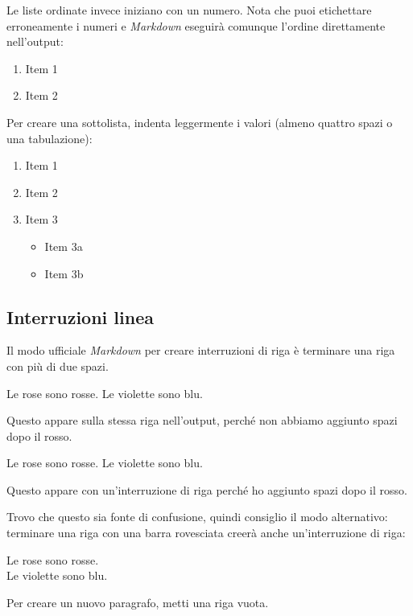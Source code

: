 \documentclass[a4paper, 11pt, nobind]{templates/ociamthesis}
\providecommand{\tightlist}{%
  \setlength{\itemsep}{0pt}\setlength{\parskip}{0pt}}
\begin{document}
Le liste ordinate invece iniziano con un numero.
Nota che puoi etichettare erroneamente i numeri e \emph{Markdown} eseguirà comunque l'ordine direttamente nell'output:

\begin{enumerate}
\def\labelenumi{\arabic{enumi}.}
\tightlist
\item
  Item 1
\item
  Item 2
\end{enumerate}

Per creare una sottolista, indenta leggermente i valori (almeno quattro spazi o una tabulazione):

\begin{enumerate}
\def\labelenumi{\arabic{enumi}.}
\tightlist
\item
  Item 1
\item
  Item 2
\item
  Item 3

  \begin{itemize}
  \tightlist
  \item
    Item 3a
  \item
    Item 3b
  \end{itemize}
\end{enumerate}

\hypertarget{interruzioni-linea}{%
\subsection{Interruzioni linea}\label{interruzioni-linea}}

Il modo ufficiale \emph{Markdown} per creare interruzioni di riga è terminare una riga con più di due spazi.

Le rose sono rosse.
Le violette sono blu.

Questo appare sulla stessa riga nell'output, perché non abbiamo aggiunto spazi dopo il rosso.

Le rose sono rosse.
Le violette sono blu.

Questo appare con un'interruzione di riga perché ho aggiunto spazi dopo il rosso.

Trovo che questo sia fonte di confusione, quindi consiglio il modo alternativo: terminare una riga con una barra rovesciata creerà anche un'interruzione di riga:

Le rose sono rosse.\\
Le violette sono blu.

Per creare un nuovo paragrafo, metti una riga vuota.
\end{document}
